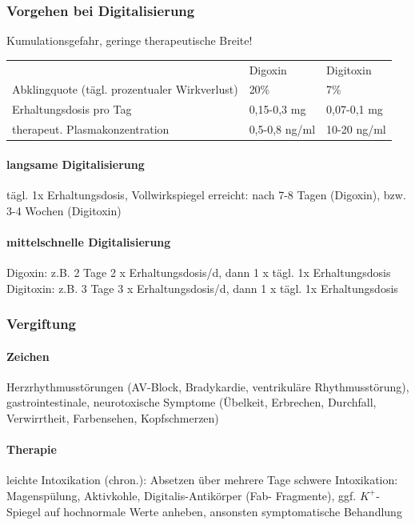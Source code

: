 \documentclass[10pt,a4paper]{report}
\begin{document}
\subsubsection{Vorgehen bei Digitalisierung}Kumulationsgefahr, geringe therapeutische Breite!\\
\begin{tabularx}{\textwidth}{XXX}
&Digoxin&Digitoxin\\
Abklingquote (tägl. prozentualer Wirkverlust)&20\%&7\%\\
Erhaltungsdosis pro Tag&0,15-0,3 mg&0,07-0,1 mg\\
therapeut. Plasmakonzentration&0,5-0,8 ng/ml&10-20 ng/ml\\
\end{tabularx}
\paragraph{langsame Digitalisierung}tägl. 1x Erhaltungsdosis, Vollwirkspiegel erreicht: nach 7-8 Tagen (Digoxin), bzw. 3-4 Wochen (Digitoxin)
\paragraph{mittelschnelle Digitalisierung}
Digoxin:   z.B. 2 Tage 2 x Erhaltungsdosis/d, dann 1 x tägl. 1x Erhaltungsdosis\\ Digitoxin: z.B. 3 Tage 3 x Erhaltungsdosis/d, dann 1 x tägl. 1x Erhaltungsdosis
\subsubsection{Vergiftung}
\paragraph{Zeichen} Herzrhythmusstörungen (AV-Block, Bradykardie, ventrikuläre Rhythmusstörung), gastrointestinale, neurotoxische Symptome (Übelkeit, Erbrechen, Durchfall, Verwirrtheit, Farbensehen, Kopfschmerzen)
\paragraph{Therapie}leichte Intoxikation (chron.): Absetzen über mehrere Tage schwere Intoxikation:	Magenspülung, Aktivkohle, Digitalis-Antikörper (Fab-				Fragmente), ggf. $K^+$-Spiegel auf hochnormale Werte anheben, ansonsten symptomatische Behandlung
\end{document}
